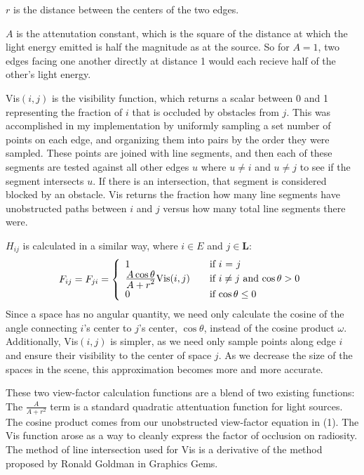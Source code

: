 \documentclass[letter]{article}
\newcommand{\vect}[1]{\boldsymbol{#1}}
\begin{document}
$r$ is the distance between the centers of the two edges.

$A$ is the attenutation constant, which is the square of the distance at which the light energy emitted is half the magnitude as at the source. So for $A = 1$, two edges facing one another directly at distance 1 would each recieve half of the other's light energy.

Vis$(i,j)$ is the visibility function, which returns a scalar between 0 and 1 representing the fraction of $i$ that is occluded by obstacles from $j$. This was accomplished in my implementation by uniformly sampling a set number of points on each edge, and organizing them into pairs by the order they were sampled. These points are joined with line segments, and then each of these segments are tested against all other edges $u$ where $u \neq i$ and $u \neq j$ to see if the segment intersects $u$. If there is an intersection, that segment is considered blocked by an obstacle. Vis returns the fraction how many line segments have unobstructed paths between $i$ and $j$ versus how many total line segments there were.

$H_{ij}$ is calculated in a similar way, where $i \in E$ and $j \in \vect{L}$:
\begin{equation}
F_{ij} = F_{ji} = \left\{ 
\begin{array}{l l}
  1 & \quad \mbox{if $i$ = $j$}\\
  \frac{\displaystyle A \cos \theta}{\displaystyle A + r^2} \mbox{Vis}(i, j) & \quad \mbox{if $i \neq j$ and $\cos \theta > 0$}\\
  0 & \quad \mbox{if $\cos \theta \leq 0$}\\
\end{array} 
\right.
\end{equation}
Since a space has no angular quantity, we need only calculate the cosine of the angle connecting $i$'s center to $j$'s center, $\cos \theta$, instead of the cosine product $\omega$. Additionally, Vis$(i,j)$ is simpler, as we need only sample points along edge $i$ and ensure their visibility to the center of space $j$. As we decrease the size of the spaces in the scene, this approximation becomes more and more accurate.

These two view-factor calculation functions are a blend of two existing functions: The $\frac{A}{A+r^2}$ term is a standard quadratic attentuation function for light sources.\cite{blender13} The cosine product comes from our unobstructed view-factor equation in (1). The Vis function arose as a way to cleanly express the factor of occlusion on radiosity. The method of line intersection used for Vis is a derivative of the method proposed by Ronald Goldman in Graphics Gems.\cite{goldman90}
\end{document}
